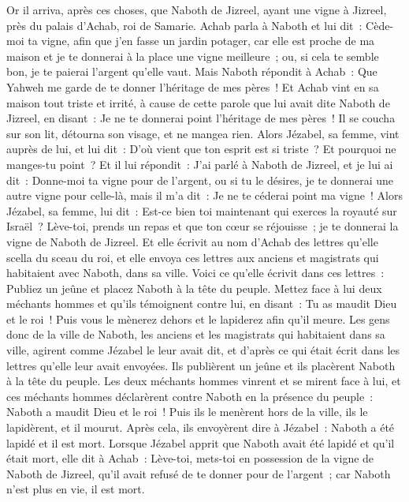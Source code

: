 \begin{multicols}{2}
\VerseOne{}Or il arriva, après ces choses, que Naboth de Jizreel, ayant une vigne à Jizreel, près du palais d'Achab, roi de Samarie.
Achab parla à Naboth et lui dit~: Cède-moi ta vigne, afin que j'en fasse un jardin potager, car elle est proche de ma maison et je te donnerai à la place une vigne meilleure~; ou, si cela te semble bon, je te paierai l'argent qu'elle vaut.
Mais Naboth répondit à Achab~: Que Yahweh me garde de te donner l'héritage de mes pères~!
Et Achab vint en sa maison tout triste et irrité, à cause de cette parole que lui avait dite Naboth de Jizreel, en disant~: Je ne te donnerai point l'héritage de mes pères~! Il se coucha sur son lit, détourna son visage, et ne mangea rien.
Alors Jézabel, sa femme, vint auprès de lui, et lui dit~: D'où vient que ton esprit est si triste~? Et pourquoi ne manges-tu point~?
Et il lui répondit~: J'ai parlé à Naboth de Jizreel, et je lui ai dit~: Donne-moi ta vigne pour de l'argent, ou si tu le désires, je te donnerai une autre vigne pour celle-là, mais il m'a dit~: Je ne te céderai point ma vigne~!
Alors Jézabel, sa femme, lui dit~: Est-ce bien toi maintenant qui exerces la royauté sur Israël~? Lève-toi, prends un repas et que ton cœur se réjouisse~; je te donnerai la vigne de Naboth de Jizreel.
Et elle écrivit au nom d'Achab des lettres qu'elle scella du sceau du roi, et elle envoya ces lettres aux anciens et magistrats qui habitaient avec Naboth, dans sa ville.
Voici ce qu'elle écrivit dans ces lettres~: Publiez un jeûne et placez Naboth à la tête du peuple.
Mettez face à lui deux méchants hommes et qu'ils témoignent contre lui, en disant~: Tu as maudit Dieu et le roi~! Puis vous le mènerez dehors et le lapiderez afin qu'il meure.
Les gens donc de la ville de Naboth, les anciens et les magistrats qui habitaient dans sa ville, agirent comme Jézabel le leur avait dit, et d'après ce qui était écrit dans les lettres qu'elle leur avait envoyées.
Ils publièrent un jeûne et ils placèrent Naboth à la tête du peuple.
Les deux méchants hommes vinrent et se mirent face à lui, et ces méchants hommes déclarèrent contre Naboth en la présence du peuple~: Naboth a maudit Dieu et le roi~! Puis ils le menèrent hors de la ville, ils le lapidèrent, et il mourut.
Après cela, ils envoyèrent dire à Jézabel~: Naboth a été lapidé et il est mort.
Lorsque Jézabel apprit que Naboth avait été lapidé et qu'il était mort, elle dit à Achab~: Lève-toi, mets-toi en possession de la vigne de Naboth de Jizreel, qu'il avait refusé de te donner pour de l'argent~; car Naboth n'est plus en vie, il est mort.

\end{multicols}
